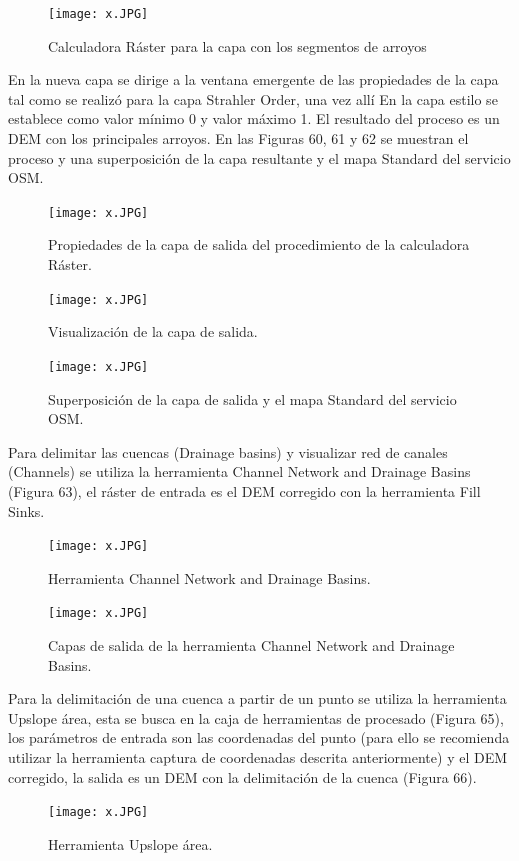 \documentclass[12pt,hidelinks]{article}
\begin{document}
\begin{figure}[H]
    \centering
    \texttt{[image: x.JPG]}
    \caption{Calculadora Ráster para la capa con los segmentos de arroyos }
 \label{fig:my_label}
\end{figure}
En la nueva capa se dirige a la ventana emergente de las propiedades de la capa tal como se realizó para la capa Strahler Order, una vez allí En la capa estilo se establece como valor mínimo 0 y valor máximo 1. El resultado del proceso es un DEM con los principales arroyos. En las Figuras 60, 61 y 62 se muestran el proceso y una superposición de la capa resultante y el mapa Standard del servicio OSM.
\begin{figure}[H]
    \centering
    \texttt{[image: x.JPG]}
    \caption{Propiedades de la capa de salida del procedimiento de la calculadora Ráster. }
 \label{fig:my_label}
\end{figure}
\begin{figure}[H]
    \centering
    \texttt{[image: x.JPG]}
    \caption{Visualización de la capa de salida. }
 \label{fig:my_label}
\end{figure}
\begin{figure}[H]
    \centering
    \texttt{[image: x.JPG]}
    \caption{Superposición de la capa de salida y el mapa Standard del servicio OSM. }
 \label{fig:my_label}
\end{figure}
Para delimitar las cuencas (Drainage basins) y visualizar red de canales (Channels) se utiliza la herramienta Channel Network and Drainage Basins (Figura 63), el ráster de entrada es el DEM corregido con la herramienta Fill Sinks.
\begin{figure}[H]
    \centering
    \texttt{[image: x.JPG]}
    \caption{Herramienta Channel Network and Drainage Basins. }
 \label{fig:my_label}
\end{figure}
\begin{figure}[H]
    \centering
    \texttt{[image: x.JPG]}
    \caption{Capas de salida de la herramienta Channel Network and Drainage Basins. }
 \label{fig:my_label}
\end{figure}
Para la delimitación de una cuenca a partir de un punto se utiliza la herramienta Upslope área, esta se busca en la caja de herramientas de procesado (Figura 65), los parámetros de entrada son las coordenadas del punto (para ello se recomienda utilizar la herramienta captura de coordenadas descrita anteriormente) y el DEM corregido, la salida es un DEM con la delimitación de la cuenca (Figura 66).
\begin{figure}[H]
    \centering
    \texttt{[image: x.JPG]}
    \caption{Herramienta Upslope área. }
 \label{fig:my_label}
\end{figure}
\end{document}

